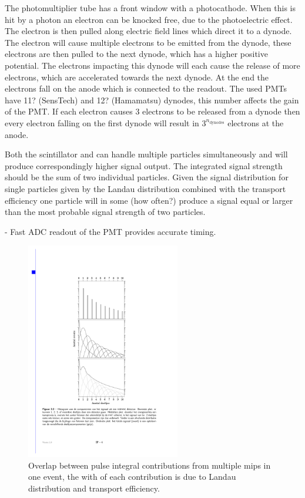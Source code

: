 The photomultiplier tube has a front window with a photocathode. When this is hit by a photon an electron can be knocked free, due to the photoelectric effect. The electron is then pulled along electric field lines which direct it to a dynode. The electron will cause multiple electrons to be emitted from the dynode, these electrons are then pulled to the next dynode, which has a higher positive potential. The electrons impacting this dynode will each cause the release of more electrons, which are accelerated towards the next dynode. At the end the electrons fall on the anode which is connected to the readout. The used PMTs have 11? (SensTech) and 12? (Hamamatsu) dynodes, this number affects the gain of the PMT. If each electron causes \num{3} electrons to be released from a dynode then every electron falling on the first dynode will result in $3^{n_{\mathrm{dynodes}}}$ electrons at the anode.

Both the scintillator and \pmt can handle multiple particles simultaneously and will produce correspondingly higher signal output. The integrated signal strength should be the sum of two individual particles. Given the signal distribution for single particles given by the Landau distribution combined with the transport efficiency one particle will in some (how often?) produce a signal equal or larger than the most probable signal strength of two particles.

- Fast ADC readout of the PMT provides accurate timing.


\begin{figure}
    \centering
    \includegraphics[width=0.6\textwidth]
                    {plots/experiment/ph_histogram_contrib}
    \caption{Overlap between pulse integral contributions from multiple mips in one event, the with of each contribution is due to Landau distribution and transport efficiency.}
    \label{fig:ph_histogram_contrib}
\end{figure}


